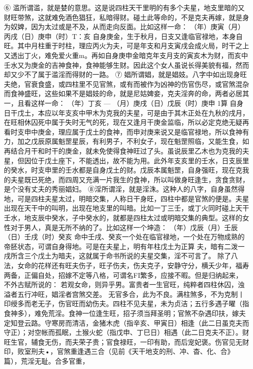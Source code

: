 ⑥	滥所谓滥，就是婪的意思。这是说四柱天干里明的有多个夫星，地支里暗的又财旺带煞，这就难免酒色猖狂，私暗得财。碰土此等命的，不是克夫再嫁，就是身为奴婢，因为太过或是不及，从而走向反面。比如这样一命：
（年）庚寅（月）丙戌（日）庚申（时）T：亥
自身庚金，生于秋月，日支又逢临官禄地，本身自旺。其中月柱重于时柱，理应丙火为夫，可是年支和月支寅戌会成火局，时干之上又透出丁火，难免爱火重m。再如自身庚申金暗克年支月支的寅亥木为财，而亥中壬水又为庚金的吉神食神，食神能够生财。因此这个女人虽说长得美貌有福，然而却又少不了属于滥淫而得财的一路。
⑦	娼所谓娼，就是娼妓。八字中如出现身旺夫绝，官衰食盛，或四柱里不见官煞，或有而被作为凶神的伤官伤尽，或官煞混杂而食神盛旺，这些如果不是娼妓的命，就是尼姑婢妾，克夫淫奔的命，两者必居其一，且看这样一命：
（年）丁亥	—
（月）庚戌（日）戊辰（时）庚申
1算
自身日干戊土，本应以年支亥中甲木为克我的夫星，可是由于其木正处在九秋的戌月，在旺相休囚死中属于失时无气的死，现在又逢月干庚金监临，所以必定克绝无疑再看时支申中庚金，理应属于戊土的食神，而申对庚来说又是临官禄地，所以食神有力，加之戊辰原属魁罡星辰，有利男子，不利女子，现在魁罡照临，又能生食，如再结合月干和时干的庚金，就未免使得食神旺过了头。虽说辰里乙木也为克我的夫星，但因位于戊土座下，不能透出，故不能为用。此外年支亥里的壬水，日支辰里的癸水，时支申里的壬水都是自身戊土的财。戊辰本属魁罡，自身强旺，现在克我的夫星既已死绝，而四周又充满一片我生的食神，所以叫做身旺逢生，贪食贪财，是个没有丈夫的秀丽娼妇。
⑧淫所谓淫，就是淫洙。这种人的八字，自身虽然得地，可是四柱夫星太过，明暗交集，人称日干身旺，四柱中都是官煞的便是。夫星出现在天干中的叫明，出现在地支里的叫暗。比如一丁三壬，或丁火同时碰上天干壬水，地支辰中癸水，子中癸水的，就都是四柱太过或明暗交集的典型。这样的女性对于男人，真是无所不纳的了。比如这样一个坤造：
（年）戊辰（月）壬辰（日）壬戌（时）癸亥
命中壬戌、癸亥一个处在临官禄地，一个处在万物成熟的帝胚状态，可谓自身得地。可是在夫星上，明有年柱戊土为正算
夫，暗有二泼一戌所含三个戊土为暗夫，这就属于命书所说的夫星交集，淫不可言了。
除了八法，女命的花样还有旺夫伤子，旺子伤夫，伤夫克子，安静守分，横夭少年，福寿两备，正偏自处，招嫁不定等八格，可谓名FI繁多，应接不暇。但是归纳起来，不外古赋所说的：
若观女命，则异乎男。富贵者一生官旺，纯粹者四柱休囚，浊溢者五行冲旺，娼淫者宫煞交差。
无官多合，此为不良。满柱煞多，不为克制丨印绶多而老无子，伤官旺而幼伤夫。四柱不见夫星，未为贞洁；五行多遇子曜（指食神多），难免荒淫。食神一位逢生旺，招子须当拜圣明；官煞不杂遇印扶，嫁夫定知登云路。守寒房而清洁，金猪木虎（指辛亥、甲寅日）相逢（此二日虽克夫而守正）；对空帐而孤眠，土猴火蛇（指戊申、丁巳日）相遇（此二日克夫不正）。财旺生官，辅食无伤，而夫荣子贵；官食禄旺，一印有助，而后宠妃褒。伤官见无财印，败室刑夫•，官煞重逢遇三合（见前《天干地支的刑、冲、杳、化、合》篇），荒淫无耻。合多官重，
